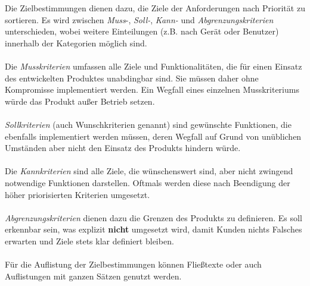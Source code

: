 \begin{tcolorbox}
Die Zielbestimmungen dienen dazu, die Ziele der Anforderungen nach Priorität zu sortieren. 
Es wird zwischen \textit{Muss}-, \textit{Soll-}, \textit{Kann-} und \textit{Abgrenzungskriterien} unterschieden, wobei weitere Einteilungen (z.B. nach Gerät oder Benutzer) innerhalb der Kategorien möglich sind.
%
\\\\
%
Die \textit{Musskriterien} umfassen alle Ziele und Funktionalitäten, die für einen Einsatz des entwickelten Produktes unabdingbar sind.
Sie müssen daher ohne Kompromisse implementiert werden.
Ein Wegfall eines einzelnen Musskriteriums würde das Produkt außer Betrieb setzen.
%
\\\\
%
\textit{Sollkriterien} (auch Wunschkriterien genannt) sind gewünschte Funktionen, die ebenfalls implementiert werden müssen, deren Wegfall auf Grund von unüblichen Umständen aber nicht den Einsatz des Produkts hindern würde.
%
\\\\
%
Die \textit{Kannkriterien} sind alle Ziele, die wünschenswert sind, aber nicht zwingend notwendige Funktionen darstellen. 
Oftmals werden diese nach Beendigung der höher priorisierten Kriterien umgesetzt.
%
\\\\
%
\textit{Abgrenzungskriterien} dienen dazu die Grenzen des Produkts zu definieren.
Es soll erkennbar sein, was explizit \textbf{nicht} umgesetzt wird, damit Kunden nichts Falsches erwarten und Ziele stets klar definiert bleiben.
%
\\\\
%
Für die Auflistung der Zielbestimmungen können Fließtexte oder auch Auflistungen mit ganzen Sätzen genutzt werden. 
\end{tcolorbox}